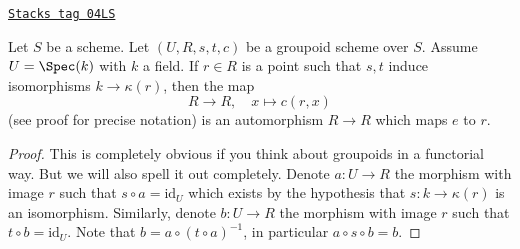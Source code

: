 \begin{lemma}
\label{more-groupoids-lemma-groupoid-on-field-move-point}
\href{https://stacks.math.columbia.edu/tag/04LS}{\texttt{Stacks tag 04LS}}

Let $S$ be a scheme. Let $(U, R, s, t, c)$ be a groupoid scheme
over $S$. Assume $U = \Spec(k)$ with $k$ a field.
If $r \in R$ is a point such that $s, t$ induce
isomorphisms $k \to \kappa(r)$, then the map
$$
R \longrightarrow R, \quad
x \longmapsto c(r, x)
$$
(see proof for precise notation) is an automorphism $R \to R$
which maps $e$ to $r$.
\end{lemma}

\begin{proof}
This is completely obvious if you think about groupoids in a
functorial way. But we will also spell it out completely.
Denote $a : U \to R$ the morphism with image $r$ such that
$s \circ a = \text{id}_U$ which exists by the hypothesis
that $s : k \to \kappa(r)$ is an isomorphism. Similarly, denote
$b : U \to R$ the morphism with image $r$ such that
$t \circ b = \text{id}_U$. Note that
$b = a \circ (t \circ a)^{-1}$, in particular
$a \circ s \circ b = b$.


\end{proof}
